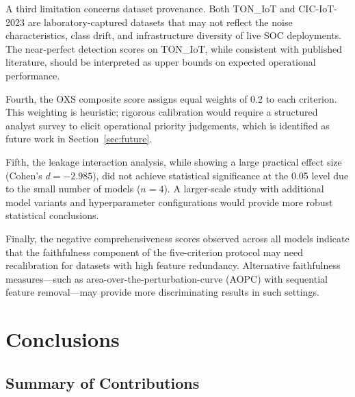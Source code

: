 \documentclass[12pt,a4paper]{report}
\begin{document}
A third limitation concerns dataset provenance. Both TON\_IoT and CIC-IoT-2023 are laboratory-captured datasets that may not reflect the noise characteristics, class drift, and infrastructure diversity of live SOC deployments. The near-perfect detection scores on TON\_IoT, while consistent with published literature, should be interpreted as upper bounds on expected operational performance.

Fourth, the OXS composite score assigns equal weights of 0.2 to each criterion. This weighting is heuristic; rigorous calibration would require a structured analyst survey to elicit operational priority judgements, which is identified as future work in Section~\ref{sec:future}.

Fifth, the leakage interaction analysis, while showing a large practical effect size (Cohen's $d = -2.985$), did not achieve statistical significance at the 0.05 level due to the small number of models ($n = 4$). A larger-scale study with additional model variants and hyperparameter configurations would provide more robust statistical conclusions.

Finally, the negative comprehensiveness scores observed across all models indicate that the faithfulness component of the five-criterion protocol may need recalibration for datasets with high feature redundancy. Alternative faithfulness measures---such as area-over-the-perturbation-curve (AOPC) with sequential feature removal---may provide more discriminating results in such settings.

\chapter{Conclusions}
\label{ch:conclusions}

\section{Summary of Contributions}
\label{sec:conclusion-contributions}
\end{document}
